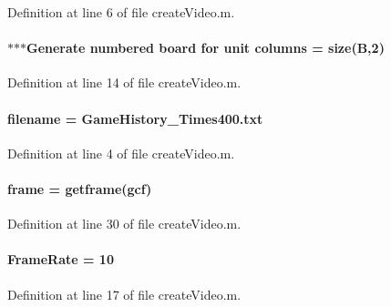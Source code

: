 Definition at line 6 of file create\+Video.\+m.

\hypertarget{a00099_aa0f5c667e1c3e498fdb0a33ed98dd988}{}
\paragraph[{columns}]{\setlength{\rightskip}{0pt plus 5cm}$\ast$$\ast$$\ast$Generate numbered board for unit columns = size({\bf B},2)}\label{a00099_aa0f5c667e1c3e498fdb0a33ed98dd988}


Definition at line 14 of file create\+Video.\+m.

\hypertarget{a00099_a2ff994e16bf9521154de4cf659a3b689}{}
\paragraph[{filename}]{\setlength{\rightskip}{0pt plus 5cm}filename = \textquotesingle{}Game\+History\+\_\+Times400.\+txt\textquotesingle{}}\label{a00099_a2ff994e16bf9521154de4cf659a3b689}


Definition at line 4 of file create\+Video.\+m.

\hypertarget{a00099_a943f49763dd36e31fc7ea8604fcad789}{}
\paragraph[{frame}]{\setlength{\rightskip}{0pt plus 5cm}frame = getframe(gcf)}\label{a00099_a943f49763dd36e31fc7ea8604fcad789}


Definition at line 30 of file create\+Video.\+m.

\hypertarget{a00099_a67157b1672f9243078fb788d8987bda8}{}
\paragraph[{Frame\+Rate}]{ Frame\+Rate = 10}\label{a00099_a67157b1672f9243078fb788d8987bda8}


Definition at line 17 of file create\+Video.\+m.

